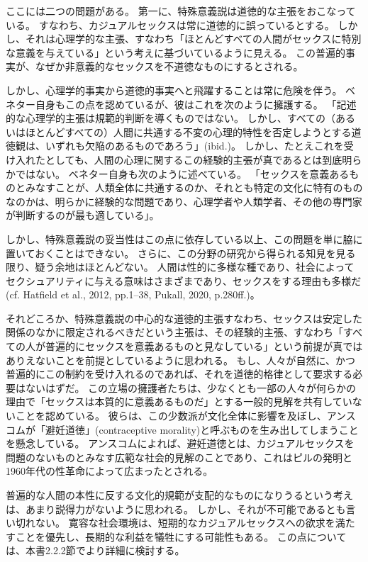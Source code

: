 \documentclass[paper=a4,book,openany]{jlreq} \usepackage{mystyle}
\begin{document}
ここには二つの問題がある。
第一に、特殊意義説は道徳的な主張をおこなっている。
すなわち、カジュアルセックスは常に道徳的に誤っているとする。
しかし、それは心理学的な主張、すなわち「ほとんどすべての人間がセックスに特別な意義を与えている」という考えに基づいているように見える。
この普遍的事実が、なぜか非意義的なセックスを不道徳なものにするとされる。

しかし、心理学的事実から道徳的事実へと飛躍することは常に危険を伴う。
ベネター自身もこの点を認めているが、彼はこれを次のように擁護する。
「記述的な心理学的主張は規範的判断を導くものではない。
しかし、すべての（あるいはほとんどすべての）人間に共通する不変の心理的特性を否定しようとする道徳観は、いずれも欠陥のあるものであろう」(ibid.)。
しかし、たとえこれを受け入れたとしても、人間の心理に関するこの経験的主張が真であるとは到底明らかではない。
ベネター自身も次のように述べている。
「セックスを意義あるものとみなすことが、人類全体に共通するのか、それとも特定の文化に特有のものなのかは、明らかに経験的な問題であり、心理学者や人類学者、その他の専門家が判断するのが最も適している」\citep[p.198]{benatar02:_two_views_sexual_ethic}。

しかし、特殊意義説の妥当性はこの点に依存している以上、この問題を単に脇に置いておくことはできない。
さらに、この分野の研究から得られる知見を見る限り、疑う余地はほとんどない。
人間は性的に多様な種であり、社会によってセクシュアリティに与える意味はさまざまであり、セックスをする理由も多様だ(cf. Hatfield et al., 2012, pp.1--38, Pukall, 2020, p.280ff.)\nocite{hatfield12:_cultur_social_gender}\nocite{pukall20:_human_sexual}。

それどころか、特殊意義説の中心的な道徳的主張{\DDASH}すなわち、セックスは安定した関係のなかに限定されるべきだという主張{\DDASH}は、その経験的主張、すなわち「すべての人が普遍的にセックスを意義あるものと見なしている」という前提が真ではありえないことを前提としているように思われる。
もし、人々が自然に、かつ普遍的にこの制約を受け入れるのであれば、それを道徳的格律として要求する必要はないはずだ。
この立場の擁護者たちは、少なくとも一部の人々が何らかの理由で「セックスは本質的に意義あるものだ」とする一般的見解を共有していないことを認めている。
彼らは、この少数派が文化全体に影響を及ぼし、アンスコムが「避妊道徳」(contraceptive morality)と呼ぶものを生み出してしまうことを懸念している。
アンスコムによれば、避妊道徳とは、カジュアルセックスを問題のないものとみなす広範な社会的見解のことであり、これはピルの発明と1960年代の性革命によって広まったとされる。

普遍的な人間の本性に反する文化的規範が支配的なものになりうるという考えは、あまり説得力がないように思われる。
しかし、それが不可能であるとも言い切れない。
寛容な社会環境は、短期的なカジュアルセックスへの欲求を満たすことを優先し、長期的な利益を犠牲にする可能性もある。
この点については、本書2.2.2節でより詳細に検討する。
\end{document}
